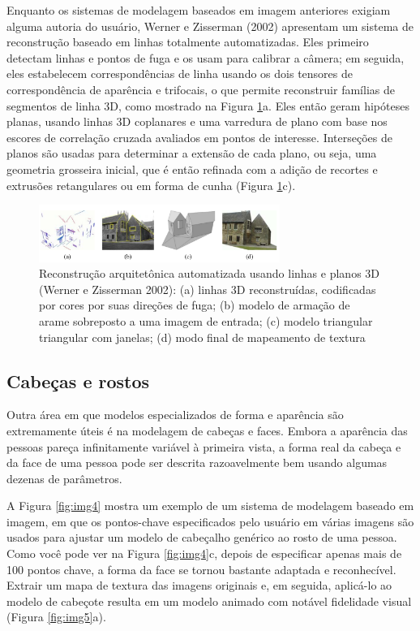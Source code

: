 \documentclass{article}
\begin{document}
Enquanto os sistemas de modelagem baseados em imagem anteriores exigiam alguma autoria do usuário, Werner e Zisserman (2002)\cite{Werner} apresentam um sistema de reconstrução baseado em linhas totalmente automatizadas. Eles primeiro detectam linhas e pontos de fuga e os usam para calibrar a câmera; em seguida, eles estabelecem correspondências de linha usando os dois tensores de correspondência de aparência e trifocais, o que permite reconstruir famílias de segmentos de linha 3D, como mostrado na Figura \ref{fig:img3}a. Eles então geram hipóteses planas, usando linhas 3D coplanares e uma varredura de plano com base nos escores de correlação cruzada avaliados em pontos de interesse. Interseções de planos são usadas para determinar a extensão de cada plano, ou seja, uma geometria grosseira inicial, que é então refinada com a adição de recortes e extrusões retangulares ou em forma de cunha (Figura \ref{fig:img3}c).

\begin{figure}[!htb]
    \centering
    \includegraphics[width=0.7\textwidth]{img3.png}
    \caption{Reconstrução arquitetônica automatizada usando linhas e planos 3D (Werner e Zisserman 2002)\cite{Werner}: (a) linhas 3D reconstruídas, codificadas por cores por suas direções de fuga; (b) modelo de armação de arame sobreposto a uma imagem de entrada; (c) modelo triangular triangular com janelas; (d) modo final de mapeamento de textura
}
    \label{fig:img3}
\end{figure}

\subsection{Cabeças e rostos}
Outra área em que modelos especializados de forma e aparência são extremamente úteis é na modelagem de cabeças e faces. Embora a aparência das pessoas pareça infinitamente variável à primeira vista, a forma real da cabeça e da face de uma pessoa pode ser descrita razoavelmente bem usando algumas dezenas de parâmetros.

A Figura \ref{fig:img4} mostra um exemplo de um sistema de modelagem baseado em imagem, em que os pontos-chave especificados pelo usuário em várias imagens são usados para ajustar um modelo de cabeçalho genérico ao rosto de uma pessoa. Como você pode ver na Figura \ref{fig:img4}c, depois de especificar apenas mais de 100 pontos chave, a forma da face se tornou bastante adaptada e reconhecível. Extrair um mapa de textura das imagens originais e, em seguida, aplicá-lo ao modelo de cabeçote resulta em um modelo animado com notável fidelidade visual (Figura \ref{fig:img5}a).
\end{document}
